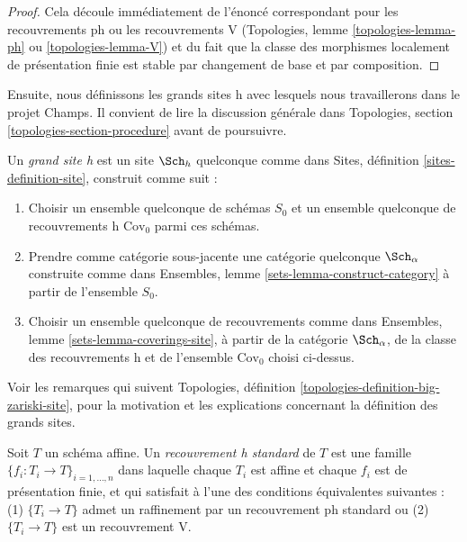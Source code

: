 \begin{proof}
Cela découle immédiatement de l'énoncé correspondant pour
les recouvrements ph ou les recouvrements V
(Topologies, lemme \ref{topologies-lemma-ph} ou
\ref{topologies-lemma-V})
et du fait que la classe des morphismes localement
de présentation finie est stable par changement de base et par
composition.
\end{proof}

\noindent
Ensuite, nous définissons les grands sites h avec lesquels nous travaillerons dans le
projet Champs. Il convient de lire la discussion générale
dans Topologies, section \ref{topologies-section-procedure}
avant de poursuivre.

\begin{definition}
\label{definition-big-h-site}
Un {\it grand site h} est un site $\Sch_h$ quelconque comme dans
Sites, définition \ref{sites-definition-site}, construit comme suit :
\begin{enumerate}
\item Choisir un ensemble quelconque de schémas $S_0$ et un ensemble quelconque de recouvrements h
$\text{Cov}_0$ parmi ces schémas.
\item Prendre comme catégorie sous-jacente une catégorie quelconque $\Sch_\alpha$
construite comme dans Ensembles, lemme \ref{sets-lemma-construct-category}
à partir de l'ensemble $S_0$.
\item Choisir un ensemble quelconque de recouvrements comme dans
Ensembles, lemme \ref{sets-lemma-coverings-site}, à partir de la
catégorie $\Sch_\alpha$, de la classe des recouvrements h
et de l'ensemble $\text{Cov}_0$ choisi ci-dessus.
\end{enumerate}
\end{definition}

\noindent
Voir les remarques qui suivent
Topologies, définition \ref{topologies-definition-big-zariski-site},
pour la motivation et les explications concernant la définition des grands sites.

\begin{definition}
\label{definition-standard-h}
Soit $T$ un schéma affine. Un {\it recouvrement h standard} de $T$
est une famille $\{f_i : T_i \to T\}_{i = 1, \ldots, n}$ dans laquelle chaque $T_i$ est
affine et chaque $f_i$ est de présentation finie, et qui satisfait à l'une des
conditions équivalentes suivantes : (1) $\{T_i \to T\}$ admet un raffinement par
un recouvrement ph standard ou (2) $\{T_i \to T\}$ est un recouvrement V.
\end{definition}


